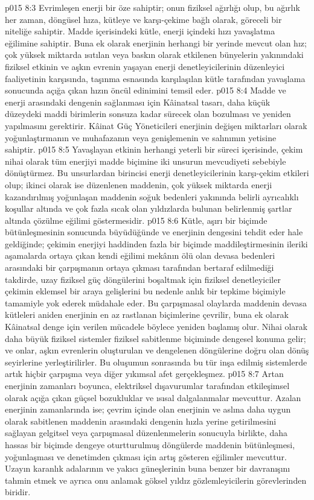 \vs p015 8:3 Evrimleşen enerji bir öze sahiptir; onun fiziksel ağırlığı olup, bu ağırlık her zaman, döngüsel hıza, kütleye ve karşı\hyp{}çekime bağlı olarak, göreceli bir niteliğe sahiptir. Madde içerisindeki kütle, enerji içindeki hızı yavaşlatma eğilimine sahiptir. Buna ek olarak enerjinin herhangi bir yerinde mevcut olan hız; çok yüksek miktarda ısıtılan veya baskın olarak etkilenen bünyelerin yakınındaki fiziksel etkinin ve aşkın evrenin yaşayan enerji denetleyicilerinin düzenleyici faaliyetinin karşısında, taşınma esnasında karşılaşılan kütle tarafından yavaşlama sonucunda açığa çıkan hızın öncül edinimini temsil eder.
\vs p015 8:4 Madde ve enerji arasındaki dengenin sağlanması için Kâinatsal tasarı, daha küçük düzeydeki maddi birimlerin sonsuza kadar sürecek olan bozulması ve yeniden yapılmasını gerektirir. Kâinat Güç Yöneticileri enerjinin değişen miktarları olarak yoğunlaştırmanın ve muhafazanın veya genişlemenin ve salınımın yetisine sahiptir.
\vs p015 8:5 Yavaşlayan etkinin herhangi yeterli bir süreci içerisinde, çekim nihai olarak tüm enerjiyi madde biçimine iki unsurun mevcudiyeti sebebiyle dönüştürmez. Bu unsurlardan birincisi enerji denetleyicilerinin karşı\hyp{}çekim etkileri olup; ikinci olarak ise düzenlenen maddenin, çok yüksek miktarda enerji kazandırılmış yoğunlaşan maddenin soğuk bedenleri yakınında belirli ayrıcalıklı koşullar altında ve çok fazla sıcak olan yıldızlarda bulunan belirlenmiş şartlar altında çözülme eğilimi göstermesidir.
\vs p015 8:6 Kütle, aşırı bir biçimde bütünleşmesinin sonucunda büyüdüğünde ve enerjinin dengesini tehdit eder hale geldiğinde; çekimin enerjiyi haddinden fazla bir biçimde maddileştirmesinin ileriki aşamalarda ortaya çıkan kendi eğilimi mekânın ölü olan devasa bedenleri arasındaki bir çarpışmanın ortaya çıkması tarafından bertaraf edilmediği takdirde, uzay fiziksel güç döngülerini boşaltmak için fiziksel denetleyiciler çekimin eklemsel bir araya gelişlerini bu nedenle anlık bir tepkime biçimiyle tamamiyle yok ederek müdahale eder. Bu çarpışmasal olaylarda maddenin devasa kütleleri aniden enerjinin en az rastlanan biçimlerine çevrilir, buna ek olarak Kâinatsal denge için verilen mücadele böylece yeniden başlamış olur. Nihai olarak daha büyük fiziksel sistemler fiziksel sabitlenme biçiminde dengesel konuma gelir; ve onlar, aşkın evrenlerin oluşturulan ve dengelenen döngülerine doğru olan dönüş seyirlerine yerleştirilirler. Bu oluşumun sonrasında bu tür inşa edilmiş sistemlerde artık hiçbir çarpışma veya diğer yıkımsal afet gerçekleşmez.
\vs p015 8:7 Artan enerjinin zamanları boyunca, elektriksel dışavurumlar tarafından etkileşimsel olarak açığa çıkan güçsel bozukluklar ve ısısal dalgalanmalar mevcuttur. Azalan enerjinin zamanlarında ise; çevrim içinde olan enerjinin ve aslına daha uygun olarak sabitlenen maddenin arasındaki dengenin hızla yerine getirilmesini sağlayan gelgitsel veya çarpışmasal düzenlenmelerin sonucuyla birlikte, daha hassas bir biçimde dengeye oturtturulmuş döngülerde maddenin bütünleşmesi, yoğunlaşması ve denetimden çıkması için artış gösteren eğilimler mevcuttur. Uzayın karanlık adalarının ve yakıcı güneşlerinin buna benzer bir davranışını tahmin etmek ve ayrıca onu anlamak göksel yıldız gözlemleyicilerin görevlerinden biridir.
